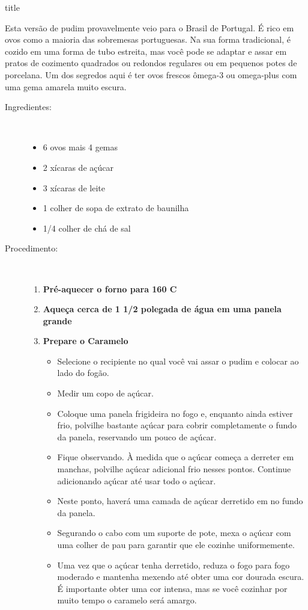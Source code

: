 \documentclass [11pt, letterpaper] {article}
\begin{document}
 {title}


\vspace {0.4 in}
Esta versão de pudim provavelmente veio para o Brasil de
Portugal. É rico em ovos como a maioria das sobremesas portuguesas. Na sua
forma tradicional, é cozido em uma forma de tubo estreita, mas você pode se adaptar
e assar em pratos de cozimento quadrados ou redondos regulares ou em pequenos
potes de porcelana. Um dos segredos aqui é ter ovos frescos ômega-3 ou omega-plus com uma gema amarela muito escura.

\vspace {0.3in}

\begin {description}

\item [Ingredientes:] \ \\
\begin {itemize}
\item 6 ovos mais 4 gemas
\item 2 xícaras de açúcar
\item 3 xícaras de leite
\item 1 colher de sopa de extrato de baunilha
\item 1/4 colher de chá de sal
\end {itemize}

\item [Procedimento:] \ \\
\begin {enumerate}
\item {\bf Pré-aquecer o forno para 160 C}
\item {\bf Aqueça cerca de 1 1/2 polegada de água em uma panela grande}
\item {\bf Prepare o Caramelo}
\begin {itemize}
\item Selecione o recipiente no qual você vai assar o pudim e colocar
ao lado do fogão.
\item Medir um copo de açúcar.
\item Coloque uma panela frigideira no fogo e, enquanto ainda estiver
frio, polvilhe bastante açúcar para cobrir completamente o fundo da panela, reservando um pouco de açúcar.
\item Fique observando. \`A medida que o açúcar começa a derreter em manchas,
polvilhe açúcar adicional frio nesses pontos. Continue adicionando açúcar até
usar todo o açúcar.
\item Neste ponto, haverá uma camada de açúcar derretido em
no fundo da panela.
\item Segurando o cabo com um suporte de pote, mexa o açúcar
com uma colher de pau para garantir que ele cozinhe uniformemente.
\item Uma vez que o açúcar tenha derretido, reduza o fogo para fogo moderado e
mantenha mexendo até obter uma cor dourada escura. É importante
obter uma cor intensa, mas se você cozinhar por muito tempo o caramelo será
amargo.


\end{itemize}
\end{enumerate}
\end{description}
\end{document}
